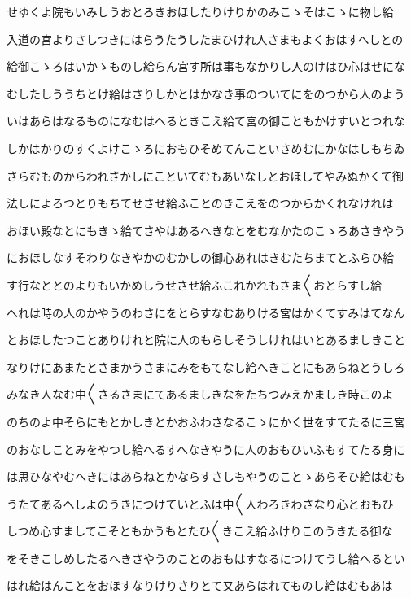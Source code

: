 \documentclass[a4paper,11pt,landscape]{ltjtarticle}
\begin{document}
せゆくよ院もいみしうおとろきおほしたりけりかのみこゝそはこゝに物し給
\par\medskip
入道の宮よりさしつきにはらうたうしたまひけれ人さまもよくおはすへしとの
\par\medskip
給御こゝろはいかゝものし給らん宮す所は事もなかりし人のけはひ心はせにな
\par\medskip
むしたしううちとけ給はさりしかとはかなき事のついてにをのつから人のよう
\par\medskip
いはあらはなるものになむはへるときこえ給て宮の御こともかけすいとつれな
\par\medskip
しかはかりのすくよけこゝろにおもひそめてんこといさめむにかなはしもちゐ
\par\medskip
さらむものからわれさかしにこといてむもあいなしとおほしてやみぬかくて御
\par\medskip
法しによろつとりもちてせさせ給ふことのきこえをのつからかくれなけれは
\par\medskip
おほい殿なとにもきゝ給てさやはあるへきなとをむなかたのこゝろあさきやう
\par\medskip
におほしなすそわりなきやかのむかしの御心あれはきむたちまてとふらひ給
\par\medskip
す行なととのよりもいかめしうせさせ給ふこれかれもさま〱おとらすし給
\par\medskip
へれは時の人のかやうのわさにをとらすなむありける宮はかくてすみはてなん
\par\medskip
とおほしたつことありけれと院に人のもらしそうしけれはいとあるましきこと
\par\medskip
なりけにあまたとさまかうさまにみをもてなし給へきことにもあらねとうしろ
\par\medskip
みなき人なむ中〱さるさまにてあるましきなをたちつみえかましき時このよ
\par\medskip
のちのよ中そらにもとかしきとかおふわさなるこゝにかく世をすてたるに三宮
\par\medskip
のおなしことみをやつし給へるすへなきやうに人のおもひいふもすてたる身に
\par\medskip
は思ひなやむへきにはあらねとかならすさしもやうのことゝあらそひ給はむも
\par\medskip
うたてあるへしよのうきにつけていとふは中〱人わろきわさなり心とおもひ
\par\medskip
しつめ心すましてこそともかうもとたひ〱きこえ給ふけりこのうきたる御な
\par\medskip
をそきこしめしたるへきさやうのことのおもはすなるにつけてうし給へるとい
\par\medskip
はれ給はんことをおほすなりけりさりとて又あらはれてものし給はむもあは
\end{document}
